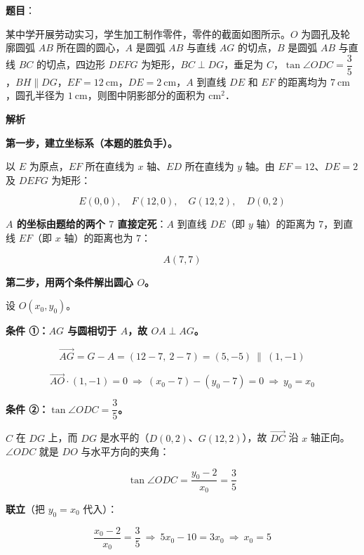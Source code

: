 \begin{answer}

\textbf{题目}：

某中学开展劳动实习，学生加工制作零件，零件的截面如图所示。$O$ 为圆孔及轮廓圆弧 $AB$ 所在圆的圆心，$A$ 是圆弧 $AB$ 与直线 $AG$ 的切点，$B$ 是圆弧 $AB$ 与直线 $BC$ 的切点，四边形 $DEFG$ 为矩形，$BC\perp DG$，垂足为 $C$，$\tan\angle ODC=\dfrac35$，$BH\parallel DG$，$EF=12\ \mathrm{cm}$，$DE=2\ \mathrm{cm}$，$A$ 到直线 $DE$ 和 $EF$ 的距离均为 $7\ \mathrm{cm}$，圆孔半径为 $1\ \mathrm{cm}$，则图中阴影部分的面积为 \gkblank{} $\mathrm{cm}^{2}$．
\nopagebreak[4]
\begin{center}\end{center}
\nopagebreak[4]
\textbf{解析}

\textbf{第一步，建立坐标系（本题的胜负手）。}

以 $E$ 为原点，$EF$ 所在直线为 $x$ 轴、$ED$ 所在直线为 $y$ 轴。由 $EF=12$、$DE=2$ 及 $DEFG$ 为矩形：

\nopagebreak[4]
\[E(0,0),\quad F(12,0),\quad G(12,2),\quad D(0,2)\]

\textbf{$A$ 的坐标由题给的两个 $7$ 直接定死}：$A$ 到直线 $DE$（即 $y$ 轴）的距离为 $7$，到直线 $EF$（即 $x$ 轴）的距离也为 $7$：

\nopagebreak[4]
\[A(7,7)\]

\textbf{第二步，用两个条件解出圆心 $O$。}

设 $O\left(x_0,y_0\right)$。

\textbf{条件 ①：$AG$ 与圆相切于 $A$，故 $OA\perp AG$。}

\nopagebreak[4]
\[\overrightarrow{AG}=G-A=(12-7,\ 2-7)=(5,-5)\ \parallel\ (1,-1)\]

\nopagebreak[4]
\[\overrightarrow{AO}\cdot(1,-1)=0\ \Longrightarrow\ \left(x_0-7\right)-\left(y_0-7\right)=0\ \Longrightarrow\ y_0=x_0\]

\textbf{条件 ②：$\tan\angle ODC=\dfrac35$。}

$C$ 在 $DG$ 上，而 $DG$ 是水平的（$D(0,2)$、$G(12,2)$），故 $\overrightarrow{DC}$ 沿 $x$ 轴正向。$\angle ODC$ 就是 $DO$ 与水平方向的夹角：

\nopagebreak[4]
\[\tan\angle ODC=\frac{y_0-2}{x_0}=\frac35\]

\textbf{联立}（把 $y_0=x_0$ 代入）：

\nopagebreak[4]
\[\frac{x_0-2}{x_0}=\frac35\ \Longrightarrow\ 5x_0-10=3x_0\ \Longrightarrow\ x_0=5\]


\end{answer}
